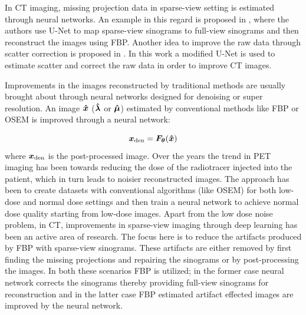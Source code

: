 In \ac{CT} imaging, missing projection data in sparse-view setting is estimated through neural networks. An example in this regard is proposed in \cite{lee2018deep}, where the authors use U-Net to map sparse-view sinograms to full-view sinograms and then reconstruct the images using \ac{FBP}. Another idea to improve the raw data through scatter correction is proposed in \cite{maier2018deep}. In this work a modified U-Net is used to estimate scatter and correct the raw data in order to improve \ac{CT} images. 

Improvements in the images reconstructed by traditional methods are usually brought about through neural networks designed for denoising or super resolution. An image $\bm{\hat{x}}$ ($\bm{\hat{\lambda}}$ or $\bm{\hat{\mu}}$) estimated by conventional methods like \ac{FBP} or \ac{OSEM} is improved through a neural network:

\begin{equation}\label{eq:post_pro}
\bm{x}_{\mathrm{den}} = \bm{F}_{\bm{\theta}} (\bm{\hat{x}})
\end{equation} 
where $\bm{x}_{\mathrm{den}}$ is the post-processed image. Over the years the trend in \ac{PET} imaging has been towards reducing the dose of the radiotracer injected into the patient, which in turn leads to noisier reconstructed images. The approach has been to create datasets with conventional algorithms (like \ac{OSEM}) for both low-dose and normal dose settings and then train a neural network to achieve normal dose quality starting from low-dose images. Apart from the low dose noise problem, in \ac{CT}, improvements in sparse-view imaging through deep learning has been an active area of research. The focus here is to reduce the artifacts produced by \ac{FBP} with sparse-view sinograms. These artifacts are either removed by first finding the missing projections and repairing the sinograms or by post-processing the images. In both these scenarios \ac{FBP} is utilized; in the former case neural network corrects the sinograms thereby providing full-view sinograms for reconstruction and in the latter case \ac{FBP} estimated artifact effected images are improved by the neural network.  

